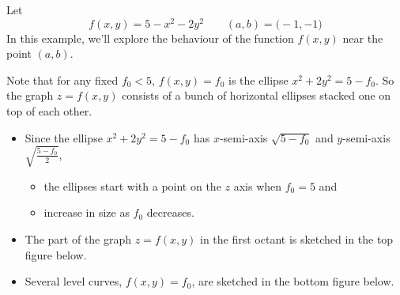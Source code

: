 \begin{eg}\label{eg dir deriv C}
Let
$$
f(x,y)=5-x^2-2y^2\qquad
(a,b)=\big(-1,-1\big)
$$
In this example, we'll explore the behaviour of the function $f(x,y)$
near the point $(a,b)$.


Note that for any fixed $f_0<5$, $f(x,y)=f_0$ is the ellipse 
$x^2+2y^2=5-f_0$. So the graph $z=f(x,y)$
consists of a bunch of horizontal ellipses stacked one on top of 
each other. 
\begin{itemize}
\item 
Since the  ellipse $x^2+2y^2=5-f_0$  has $x$-semi-axis $\sqrt{5-f_0}$ 
and $y$-semi-axis $\sqrt{\frac{5-f_0}{2}}$, 
\begin{itemize}
\item
    the ellipses start with a point on the $z$ axis when $f_0=5$ and 
\item
    increase in size as $f_0$ decreases.
\end{itemize}
\item 
The part of the graph $z=f(x,y)$ in the first octant is sketched in
the top figure below.

\item 
Several level curves, $f(x,y)=f_0$, are sketched in the bottom figure below. 


\end{itemize}
\end{eg}
